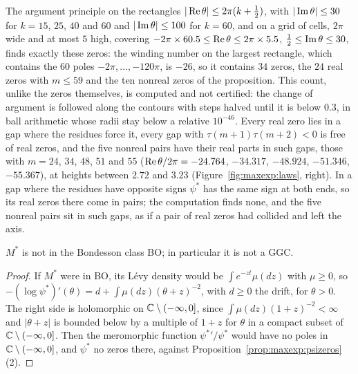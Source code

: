 The argument principle on the rectangles $|\operatorname{Re}\theta|\le2\pi(k+\frac12)$, with $|\operatorname{Im}\theta|\le30$ for $k=15$, $25$, $40$ and $60$ and $|\operatorname{Im}\theta|\le100$ for $k=60$, and on a grid of cells, $2\pi$ wide and at most $5$ high, covering $-2\pi\times60.5\le\operatorname{Re}\theta\le2\pi\times5.5$, $\frac12\le\operatorname{Im}\theta\le30$, finds exactly these zeros: the winding number on the largest rectangle, which contains the $60$ poles $-2\pi,\dots,-120\pi$, is $-26$, so it contains $34$ zeros, the $24$ real zeros with $m\le59$ and the ten nonreal zeros of the proposition. This count, unlike the zeros themselves, is computed and not certified: the change of argument is followed along the contours with steps halved until it is below $0.3$, in ball arithmetic whose radii stay below a relative $10^{-46}$. Every real zero lies in a gap where the residues force it, every gap with $\tau(m+1)\tau(m+2)<0$ is free of real zeros, and the five nonreal pairs have their real parts in such gaps, those with $m=24$, $34$, $48$, $51$ and $55$ ($\operatorname{Re}\theta/2\pi=-24.764$, $-34.317$, $-48.924$, $-51.346$, $-55.367$), at heights between $2.72$ and $3.23$ (Figure~\ref{fig:maxexp:laws}, right). In a gap where the residues have opposite signs $\psi^*$ has the same sign at both ends, so its real zeros there come in pairs; the computation finds none, and the five nonreal pairs sit in such gaps, as if a pair of real zeros had collided and left the axis.

\begin{corollary}\label{cor:maxexp:notBO}
$M^*$ is not in the Bondesson class BO; in particular it is not a GGC.
\end{corollary}

\begin{proof}
If $M^*$ were in BO, its L\'evy density would be $\int e^{-zt}\mu(dz)$ with $\mu\ge0$, so $-(\log\psi^*)'(\theta)=d+\int\mu(dz)(\theta+z)^{-2}$, with $d\ge0$ the drift, for $\theta>0$. The right side is holomorphic on $\mathbb{C}\setminus(-\infty,0]$, since $\int\mu(dz)(1+z)^{-2}<\infty$ and $|\theta+z|$ is bounded below by a multiple of $1+z$ for $\theta$ in a compact subset of $\mathbb{C}\setminus(-\infty,0]$. Then the meromorphic function ${\psi^*}'/\psi^*$ would have no poles in $\mathbb{C}\setminus(-\infty,0]$, and $\psi^*$ no zeros there, against Proposition~\ref{prop:maxexp:psizeros}(2).
\end{proof}


